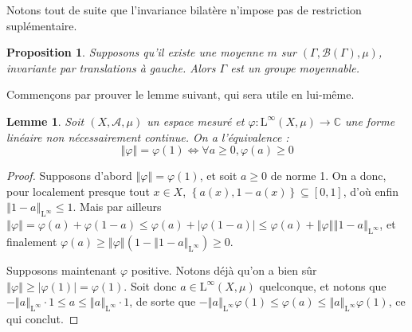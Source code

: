 \documentclass[a4paper,12pt]{article}
\newtheorem{proposition}[theorem]{Proposition}
\newtheorem{lemma}[theorem]{Lemme}
\newcommand{\C}{\mathbb{C}}
\newcommand{\Bor}{\mathcal{B}}
\newcommand{\norm}[1]{\left\Vert #1\right\Vert}
\newcommand{\abs}[1]{\left\vert#1\right\vert}
\newcommand{\set}[1]{\left\{ #1 \right\}}
\renewcommand{\iff}{\Leftrightarrow}
\begin{document}
Notons tout de suite que l'invariance bilatère n'impose pas de restriction suplémentaire. 
\begin{proposition}\label{bilateral_of_left}
    Supposons qu'il existe une moyenne $m$ sur $(\Gamma, \Bor(\Gamma), \mu)$, invariante par translations \emph{à gauche}.
    Alors $\Gamma$ est un groupe moyennable.
\end{proposition} 

Commençons par prouver le lemme suivant, qui sera utile en lui-même.

\begin{lemma}\label{positive_iff_norm}
    Soit $(X, \mathcal{A}, \mu)$ un espace mesuré et $\varphi:\mathrm{L}^\infty(X,\mu)\to\C$ une forme linéaire \emph{non nécessairement continue}. 
    On a l'équivalence :
    \begin{equation*}
        \norm{\varphi} = \varphi(1) \iff \forall a \ge 0, \varphi(a) \geq 0
    \end{equation*}
\end{lemma}

\begin{proof}
    Supposons d'abord $\norm{\varphi} = \varphi(1)$, et soit $a\ge 0$ de norme 1. On a donc, pour localement presque tout $x\in X$, $\set{a(x), 1-a(x)}\subseteq[0,1]$,
    d'où enfin $\norm{1-a}_{\mathrm{L}^\infty}\le 1$. Mais par ailleurs $\norm{\varphi} = \varphi(a) + \varphi(1-a) \le \varphi(a) + \abs{\varphi(1-a)} \le \varphi(a) + \norm{\varphi}\norm{1 - a}_{\mathrm{L}^\infty}$, et finalement
    $\varphi(a)\ge \norm{\varphi}\left(1 - \norm{1-a}_{\mathrm{L}^\infty}\right) \ge0$. 

    Supposons maintenant $\varphi$ positive. Notons déjà qu'on a bien sûr $\norm{\varphi}\ge\abs{\varphi(1)}=\varphi(1)$. Soit donc $a\in\mathrm{L}^\infty(X,\mu)$ quelconque,
    et notons que $-\norm{a}_{\mathrm{L}^\infty}\cdot1\le a\le\norm{a}_{\mathrm{L}^\infty}\cdot1$, de sorte que $-\norm{a}_{\mathrm{L}^\infty}\varphi(1)\le\varphi(a)\le\norm{a}_{\mathrm{L}^\infty}\varphi(1)$, ce qui conclut.
\end{proof}
\end{document}
